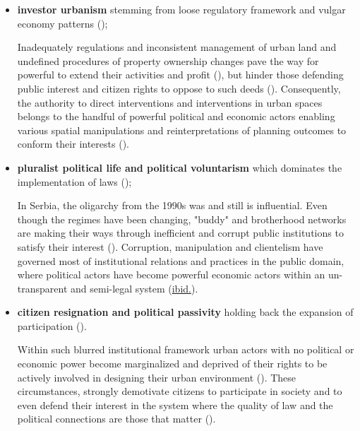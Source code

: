 \documentclass[11pt]{report}
\begin{document}
\begin{itemize}
\item \textbf{investor urbanism} stemming from loose regulatory framework and vulgar economy patterns (\href{Vujosevic}{\citealt{vujosevic_post-socialist_2010}});

Inadequately regulations and inconsistent management of urban land and undefined procedures of property ownership  changes pave the way for powerful to extend their activities and profit (\citealt{ref}), but hinder those defending public interest and citizen rights to oppose to such deeds (\href{Vujovic}{\citealt{vujovic_belgrades_2007}}).
Consequently, the authority to direct interventions and interventions in urban spaces belongs to the handful of powerful political and economic actors enabling various spatial manipulations and reinterpretations of planning outcomes to conform their interests (\href{Van}{\citealt{van_assche_co-evolutions_2013}}).

\item \textbf{pluralist political life and political voluntarism} which dominates the implementation of laws (\href{Djokic}{\citealt{djokic_political_2007}});

In Serbia, the oligarchy from the 1990s was and still is influential. Even though the regimes have been changing, "buddy" and brotherhood networks are making their ways through inefficient and corrupt public institutions to satisfy their interest (\href{Vujovic}{\citealt{vujovic_belgrades_2007}}).
Corruption, manipulation and clientelism have governed most of institutional relations and practices in the 
public domain, where political actors have become powerful economic actors within an un-transparent and 
semi-legal system (\href{Vujovic}{ibid.}).

\item \textbf{citizen resignation and political passivity} holding back the expansion of participation (\href{Vujovic}{\citealt{vujovic_belgrades_2007}}). 

Within such blurred institutional framework urban actors with no political or economic power become marginalized and deprived of their rights to be actively involved in designing their urban environment (\href{Bolay}{\citealt{bolay_urban_2005}}).
These circumstances, strongly demotivate citizens to participate in society and to even defend their interest in the system where the quality of law and the political connections are those that matter (\href{Vujovic}{\citealt{vujovic_belgrades_2007}}).
\end{itemize}
\end{document}
